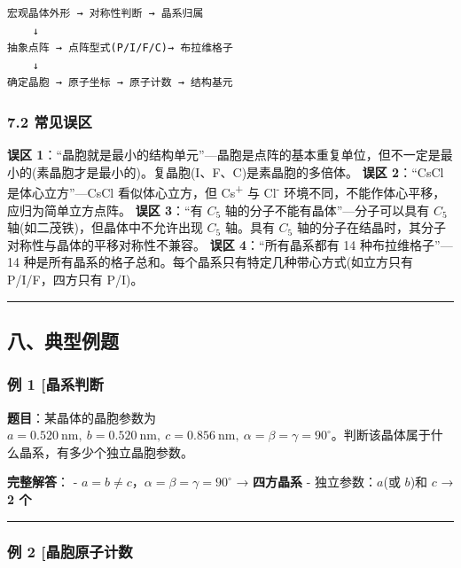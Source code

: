 \begin{verbatim}
宏观晶体外形 → 对称性判断 → 晶系归属
    ↓
抽象点阵 → 点阵型式(P/I/F/C)→ 布拉维格子
    ↓
确定晶胞 → 原子坐标 → 原子计数 → 结构基元
\end{verbatim}

\subsubsection{7.2 常见误区}\label{ux5e38ux89c1ux8befux533a}

\textbf{误区 1}：``晶胞就是最小的结构单元''---晶胞是点阵的基本重复单位，但不一定是最小的(素晶胞才是最小的)。复晶胞(I、F、C)是素晶胞的多倍体。
\textbf{误区 2}：``CsCl 是体心立方''---CsCl 看似体心立方，但 Cs\textsuperscript{+} 与 Cl\textsuperscript{-} 环境不同，不能作体心平移，应归为简单立方点阵。
\textbf{误区 3}：``有 \(C_5\) 轴的分子不能有晶体''---分子可以具有 \(C_5\) 轴(如二茂铁)，但晶体中不允许出现 \(C_5\) 轴。具有 \(C_5\) 轴的分子在结晶时，其分子对称性与晶体的平移对称性不兼容。
\textbf{误区 4}：``所有晶系都有 14 种布拉维格子''---14 种是所有晶系的格子总和。每个晶系只有特定几种带心方式(如立方只有 P/I/F，四方只有 P/I)。

\begin{center}\rule{0.5\linewidth}{0.5pt}\end{center}

\subsection{八、典型例题}\label{ux516bux5178ux578bux4f8bux9898}

\subsubsection{例 1 {[}晶系判断}\label{ux4f8b-1-ux6676ux7cfbux5224ux65ad}

\textbf{题目}：某晶体的晶胞参数为 \(a = 0.520\ \mathrm{nm},\ b = 0.520\ \mathrm{nm},\ c = 0.856\ \mathrm{nm},\ \alpha = \beta = \gamma = 90^\circ\)。判断该晶体属于什么晶系，有多少个独立晶胞参数。

\textbf{完整解答}：
- \(a = b \neq c\)，\(\alpha = \beta = \gamma = 90^\circ\) → \textbf{四方晶系}
- 独立参数：\(a\)(或 \(b\))和 \(c\) → \textbf{2 个}

\begin{center}\rule{0.5\linewidth}{0.5pt}\end{center}

\subsubsection{例 2 {[}晶胞原子计数}\label{ux4f8b-2-ux6676ux80deux539fux5b50ux8ba1ux6570}

